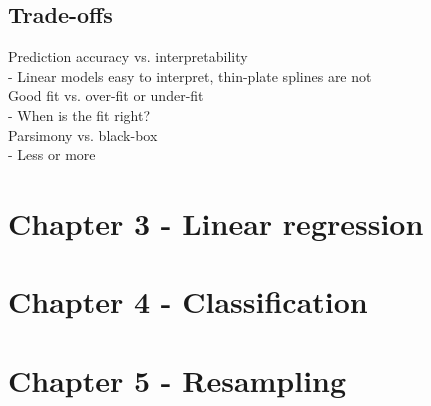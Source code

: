 \subsection*{Trade-offs}
Prediction accuracy vs. interpretability\\
- Linear models easy to interpret, thin-plate splines are not\\
Good fit vs. over-fit or under-fit\\
- When is the fit right?\\
Parsimony vs. black-box\\
- Less or more\\



\section*{Chapter 3 - Linear regression}

\section*{Chapter 4 - Classification}

\section*{Chapter 5 - Resampling}



